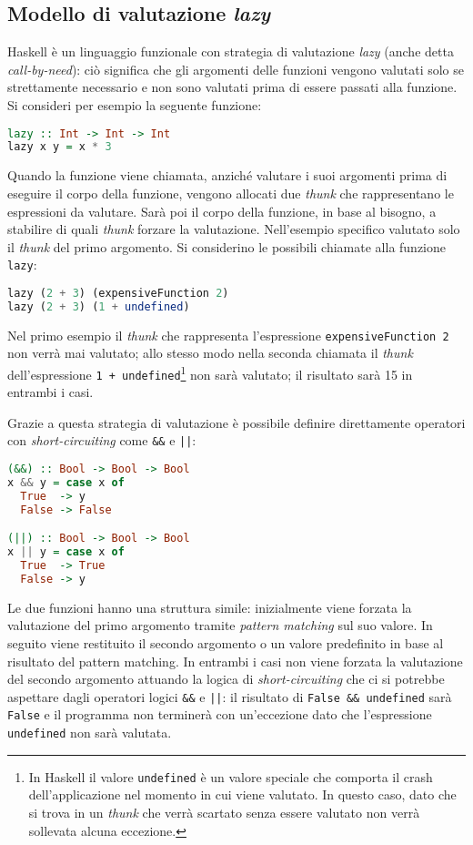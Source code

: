 \subsection{Modello di valutazione \emph{lazy}}
Haskell è un linguaggio funzionale con strategia di valutazione \emph{lazy} (anche detta \emph{call-by-need}): ciò significa che gli argomenti delle funzioni vengono valutati solo se strettamente necessario e non sono valutati prima di essere passati alla funzione. Si consideri per esempio la seguente funzione:
\begin{lstlisting}[language=haskell]
lazy :: Int -> Int -> Int
lazy x y = x * 3
\end{lstlisting}
Quando la funzione viene chiamata, anziché valutare i suoi argomenti prima di eseguire il corpo della funzione, vengono allocati due \emph{thunk} che rappresentano le espressioni da valutare. Sarà poi il corpo della funzione, in base al bisogno, a stabilire di quali \emph{thunk} forzare la valutazione. Nell'esempio specifico valutato solo il \emph{thunk} del primo argomento. Si considerino le possibili chiamate alla funzione \lstinline{lazy}:
\begin{lstlisting}[language=haskell]
lazy (2 + 3) (expensiveFunction 2)
lazy (2 + 3) (1 + undefined)
\end{lstlisting}
Nel primo esempio il \emph{thunk} che rappresenta l'espressione \lstinline{expensiveFunction 2} non verrà mai valutato; allo stesso modo nella seconda chiamata il \emph{thunk} dell'espressione \lstinline{1 + undefined}\footnote{In Haskell il valore \lstinline{undefined} è un valore speciale che comporta il crash dell'applicazione nel momento in cui viene valutato. In questo caso, dato che si trova in un \emph{thunk} che verrà scartato senza essere valutato non verrà sollevata alcuna eccezione.} non sarà valutato; il risultato sarà 15 in entrambi i casi.

Grazie a questa strategia di valutazione è possibile definire direttamente operatori con \emph{short-circuiting} come \lstinline{&&} e \lstinline{||}:
\begin{lstlisting}[language=haskell]
(&&) :: Bool -> Bool -> Bool
x && y = case x of
  True  -> y
  False -> False 

(||) :: Bool -> Bool -> Bool
x || y = case x of
  True  -> True
  False -> y
\end{lstlisting}
Le due funzioni hanno una struttura simile: inizialmente viene forzata la valutazione del primo argomento tramite \emph{pattern matching} sul suo valore. In seguito viene restituito il secondo argomento o un valore predefinito in base al risultato del pattern matching. In entrambi i casi non viene forzata la valutazione del secondo argomento attuando la logica di \emph{short-circuiting} che ci si potrebbe aspettare dagli operatori logici \lstinline{&&} e \lstinline{||}: il risultato di \lstinline{False && undefined} sarà \lstinline{False} e il programma non terminerà con un'eccezione dato che l'espressione \lstinline{undefined} non sarà valutata.

